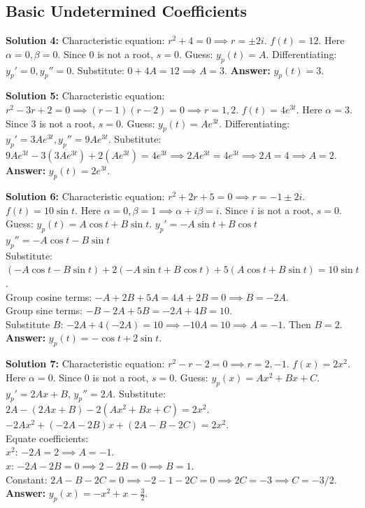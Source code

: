 \documentclass[11pt]{article}
\begin{document}
\subsection*{Basic Undetermined Coefficients}

\textbf{Solution 4:} 
Characteristic equation: $r^2 + 4 = 0 \implies r = \pm 2i$. 
$f(t) = 12$. Here $\alpha=0, \beta=0$. Since $0$ is not a root, $s=0$. 
Guess: $y_p(t) = A$. 
Differentiating: $y_p' = 0, y_p'' = 0$. 
Substitute: $0 + 4A = 12 \implies A = 3$. 
\textbf{Answer:} $y_p(t) = 3$.

\textbf{Solution 5:} 
Characteristic equation: $r^2 - 3r + 2 = 0 \implies (r-1)(r-2) = 0 \implies r = 1, 2$. 
$f(t) = 4e^{3t}$. Here $\alpha=3$. Since $3$ is not a root, $s=0$. 
Guess: $y_p(t) = Ae^{3t}$. 
Differentiating: $y_p' = 3Ae^{3t}, y_p'' = 9Ae^{3t}$. 
Substitute: $9Ae^{3t} - 3(3Ae^{3t}) + 2(Ae^{3t}) = 4e^{3t} \implies 2Ae^{3t} = 4e^{3t} \implies 2A = 4 \implies A = 2$. 
\textbf{Answer:} $y_p(t) = 2e^{3t}$.

\textbf{Solution 6:} 
Characteristic equation: $r^2 + 2r + 5 = 0 \implies r = -1 \pm 2i$. 
$f(t) = 10\sin t$. Here $\alpha=0, \beta=1 \implies \alpha+i\beta = i$. Since $i$ is not a root, $s=0$. 
Guess: $y_p(t) = A\cos t + B\sin t$. 
$y_p' = -A\sin t + B\cos t$ \\
$y_p'' = -A\cos t - B\sin t$ \\
Substitute: 
$(-A\cos t - B\sin t) + 2(-A\sin t + B\cos t) + 5(A\cos t + B\sin t) = 10\sin t$. \\
Group cosine terms: $-A + 2B + 5A = 4A + 2B = 0 \implies B = -2A$. \\
Group sine terms: $-B - 2A + 5B = -2A + 4B = 10$. \\
Substitute $B$: $-2A + 4(-2A) = 10 \implies -10A = 10 \implies A = -1$. Then $B = 2$. \\
\textbf{Answer:} $y_p(t) = -\cos t + 2\sin t$.

\textbf{Solution 7:} 
Characteristic equation: $r^2 - r - 2 = 0 \implies r = 2, -1$. 
$f(x) = 2x^2$. Here $\alpha=0$. Since $0$ is not a root, $s=0$. 
Guess: $y_p(x) = Ax^2 + Bx + C$. 
$y_p' = 2Ax + B$, $y_p'' = 2A$. 
Substitute: $2A - (2Ax + B) - 2(Ax^2 + Bx + C) = 2x^2$. \\
$-2Ax^2 + (-2A - 2B)x + (2A - B - 2C) = 2x^2$. \\
Equate coefficients: \\
$x^2$: $-2A = 2 \implies A = -1$. \\
$x$: $-2A - 2B = 0 \implies 2 - 2B = 0 \implies B = 1$. \\
Constant: $2A - B - 2C = 0 \implies -2 - 1 - 2C = 0 \implies 2C = -3 \implies C = -3/2$. \\
\textbf{Answer:} $y_p(x) = -x^2 + x - \frac{3}{2}$.
\end{document}
